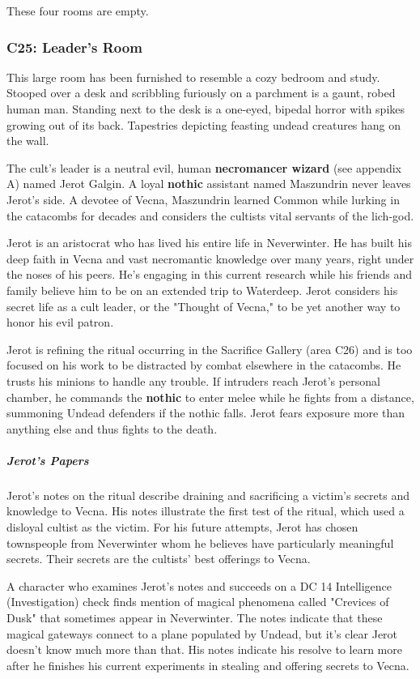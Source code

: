 \documentclass[10pt,a4paper,twoside,bg=print,twocolumn,openany,nodeprecatedcode]{dndbook}
\begin{document}
These four rooms are empty.

\subsubsection{C25: Leader's Room}
\begin{DndReadAloud}{}
This large room has been furnished to resemble a cozy bedroom and study. Stooped over a desk and scribbling furiously on a parchment is a gaunt, robed human man. Standing next to the desk is a one-eyed, bipedal horror with spikes growing out of its back. Tapestries depicting feasting undead creatures hang on the wall.

\end{DndReadAloud}

The cult's leader is a neutral evil, human \textbf{necromancer wizard} (see appendix A) named Jerot Galgin. A loyal \textbf{nothic} assistant named Maszundrin never leaves Jerot's side. A devotee of Vecna, Maszundrin learned Common while lurking in the catacombs for decades and considers the cultists vital servants of the lich-god.

Jerot is an aristocrat who has lived his entire life in Neverwinter. He has built his deep faith in Vecna and vast necromantic knowledge over many years, right under the noses of his peers. He's engaging in this current research while his friends and family believe him to be on an extended trip to Waterdeep. Jerot considers his secret life as a cult leader, or the "Thought of Vecna," to be yet another way to honor his evil patron.

Jerot is refining the ritual occurring in the Sacrifice Gallery (area C26) and is too focused on his work to be distracted by combat elsewhere in the catacombs. He trusts his minions to handle any trouble. If intruders reach Jerot's personal chamber, he commands the \textbf{nothic} to enter melee while he fights from a distance, summoning Undead defenders if the nothic falls. Jerot fears exposure more than anything else and thus fights to the death.

\subparagraph{Jerot's Papers}
Jerot's notes on the ritual describe draining and sacrificing a victim's secrets and knowledge to Vecna. His notes illustrate the first test of the ritual, which used a disloyal cultist as the victim. For his future attempts, Jerot has chosen townspeople from Neverwinter whom he believes have particularly meaningful secrets. Their secrets are the cultists' best offerings to Vecna.

A character who examines Jerot's notes and succeeds on a DC 14 Intelligence (Investigation) check finds mention of magical phenomena called "Crevices of Dusk" that sometimes appear in Neverwinter. The notes indicate that these magical gateways connect to a plane populated by Undead, but it's clear Jerot doesn't know much more than that. His notes indicate his resolve to learn more after he finishes his current experiments in stealing and offering secrets to Vecna.
\end{document}

